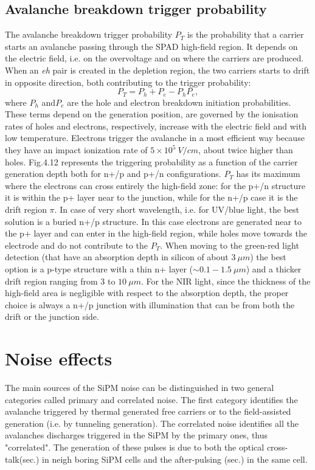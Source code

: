 \subsection*{Avalanche breakdown trigger probability}
The avalanche breakdown trigger probability $P_T$ is the probability that a carrier starts an avalanche passing through the SPAD high-field region.
It depends on the electric field, i.e. on the overvoltage and on where the carriers are produced. When an \textit{eh} pair is created in the depletion region, the two carriers starts to drift in opposite direction, both contributing to the trigger probability:
\begin{equation}
	P_T = P_h + P_e - P_hP_e,
\end{equation}
where $P_h$ and$P_e$ are the hole and electron breakdown initiation probabilities.
These terms depend on the generation position, are governed by the ionisation rates of holes and electrons, respectively, increase with the electric field and with low temperature.
Electrons trigger the avalanche in a most efficient way because they have an impact ionization rate of $5\times 10^5\ V/cm$, about twice higher than holes.
Fig.4.12 represents the triggering probability as a function of the carrier generation depth both for n+/p and p+/n configurations.
$P_T$ has its maximum where the electrons can cross entirely the high-field zone: for the p+/n structure it is within the p+ layer near to the junction, while for the n+/p case it is the drift region $\pi$. In case of very short wavelength, i.e. for UV/blue light, the best solution is a buried n+/p structure. In this case electrons are generated near to the p+ layer and can enter in the high-field region, while holes move towards the electrode and do not contribute to the $P_T$. When moving to the green-red light detection (that have an absorption depth in silicon of about $3\ \mu m$) the best option is a p-type structure with a thin n+ layer ($\sim 0.1-1.5\ \mu m$) and a thicker drift region ranging from $3$ to $10\ \mu m$.
For the NIR light, since the thickness of the high-field area is negligible with respect to the absorption depth, the proper choice is always a n+/p junction with illumination that can be from both the drift or the junction side.\\

\section{Noise effects}
The main sources of the SiPM noise can be distinguished in two general categories called primary and correlated noise. The first category identifies the avalanche triggered by thermal generated free carriers or to the field-assisted generation (i.e. by tunneling generation). The correlated noise identifies all the avalanches discharges triggered in the SiPM by the primary ones, thus "correlated". The generation of these pulses is due to both the optical cross-talk(sec.) in neigh boring SiPM cells and the after-pulsing (sec.) in the same cell.

